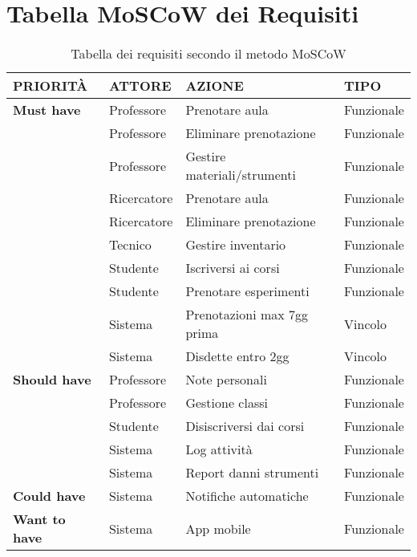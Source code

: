 \documentclass[11pt,a4paper]{report}
\begin{document}
\section{Tabella MoSCoW dei Requisiti}
\begin{table}[!ht]
\centering
\renewcommand\arraystretch{1.4}
\begin{tabular}{|p{3.5cm}|p{3.5cm}|p{3cm}|p{3cm}|}
\hline
\textbf{PRIORITÀ} & \textbf{ATTORE} & \textbf{AZIONE} & \textbf{TIPO} \\
\hline
\textbf{Must have} & Professore   & Prenotare aula                  & Funzionale \\ \cline{2-4}
                   & Professore   & Eliminare prenotazione          & Funzionale \\ \cline{2-4}
                   & Professore   & Gestire materiali/strumenti     & Funzionale \\ \cline{2-4}
                   & Ricercatore  & Prenotare aula                  & Funzionale \\ \cline{2-4}
                   & Ricercatore  & Eliminare prenotazione          & Funzionale \\ \cline{2-4}
                   & Tecnico      & Gestire inventario              & Funzionale \\ \cline{2-4}
                   & Studente     & Iscriversi ai corsi             & Funzionale \\ \cline{2-4}
                   & Studente     & Prenotare esperimenti           & Funzionale \\ \cline{2-4}
                   & Sistema      & Prenotazioni max 7gg prima      & Vincolo    \\ \cline{2-4}
                   & Sistema      & Disdette entro 2gg              & Vincolo    \\ 
\hline
\textbf{Should have} & Professore & Note personali                  & Funzionale \\ \cline{2-4}
                    & Professore & Gestione classi                 & Funzionale \\ \cline{2-4}
                    & Studente   & Disiscriversi dai corsi         & Funzionale \\ \cline{2-4}
                    & Sistema    & Log attività                    & Funzionale \\ \cline{2-4}
                    & Sistema    & Report danni strumenti          & Funzionale \\ 
\hline
\textbf{Could have} & Sistema    & Notifiche automatiche           & Funzionale \\ 
\hline
\textbf{Want to have} & Sistema  & App mobile                      & Funzionale     \\ 
\hline
\end{tabular}
\caption{Tabella dei requisiti secondo il metodo MoSCoW}
\end{table}
\newpage
\end{document}
